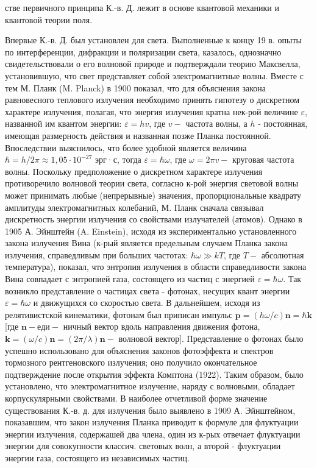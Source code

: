 \documentclass[10pt]{article}
\begin{document}
стве первичного принципа К.-в. Д. лежит в основе квантовой механики и квантовой теории поля.



Впервые К.-в. Д. был установлен для света. Выполненные к концу 19 в. опыты по интерференции, дифракции и поляризации света, казалось, однозначно свидетельствовали о его волновой природе и подтверждали теорию Максвелла, установившую, что свет представляет собой электромагнитные волны. Вместе с тем М. Планк (M. Planck) в 1900 показал, что для объяснения закона равновесного теплового излучения необходимо принять гипотезу о дискретном характере излучения, полагая, что энергия излучения кратна нек-рой величине $\varepsilon$, названной им квантом энергии: $\varepsilon=h v$, где $v-$ частота волны, а $h$ - постоянная, имеющая размерность действия и названная позже Планка постоянной. Впоследствии выяснилось, что более удобной является величина $\hbar=h / 2 \pi \approx 1,05 \cdot 10^{-27}$ эрг·с, тогда $\varepsilon=\hbar \omega$, где $\omega=2 \pi v-$ круговая частота волны. Поскольку предположение о дискретном характере излучения противоречило волновой теории света, согласно к-рой энергия световой волны может принимать любые (непрерывные) значения, пропорциональные квадрату амплитуды электромагнитных колебаний, М. Планк сначала связывал дискретность энергии излучения со свойствами излучателей (атомов). Однако в 1905 А. Эйнштейн (A. Einstein), исходя из экспериментально установленного закона излучения Вина (к-рый является предельным случаем Планка закона излучения, справедливым при больших частотах: $\hbar \omega \gg k T$, где $T-$ абсолютная температура), показал, что энтропия излучения в области справедливости закона Вина совпадает с энтропией газа, состоящего из частиц с энергией $\varepsilon=\hbar \omega$. Так возникло представление о частицах света - фотонах, несущих квант энергии $\varepsilon=\hbar \omega$ и движущихся со скоростью света. В дальнейшем, исходя из релятивистской кинематики, фотонам был приписан импульс $\boldsymbol{p}=(h \omega / c) \boldsymbol{n}=\hbar \boldsymbol{k}$ [где $\boldsymbol{n}-\mathrm{еди-}$ ничный вектор вдоль направления движения фотона, $\boldsymbol{k}=(\omega / c) \boldsymbol{n}=(2 \pi / \lambda) \boldsymbol{n}-$ волновой вектор]. Представление о фотонах было успешно использовано для объяснения законов фотоэффекта и спектров тормозного рентгеновского излучения; оно получило окончательное подтверждение после открытия эффекта Комптона (1922). Таким образом, было установлено, что электромагнитное излучение, наряду с волновыми, обладает корпускулярными свойствами. В наиболее отчетливой форме значение существования К.-в. д. для излучения было выявлено в 1909 А. Эйнштейном, показавшим, что закон излучения Планка приводит к формуле для флуктуации энергии излучения, содержашей два члена, один из к-рых отвечает флуктуации энергии для совокупности классич. световых волн, а второй - флуктуации энергии газа, состоящего из независимых частиц.
\end{document}
